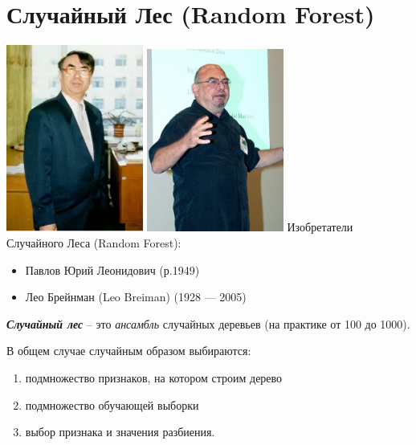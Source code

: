 \documentclass{beamer}
\newcommand{\termdef}[1]{\textbf{\textit{#1}}}
\newcommand{\term}{\textit}
\begin{document}
\section{Случайный Лес (Random Forest)}\label{section:random_forest}

\begin{frame}
	\includegraphics[width=4.5cm]{../pic/ylpavlov.png}
	\includegraphics[width=4.5cm]{../pic/leo_breiman.png}
	Изобретатели Случайного Леса (Random Forest):
	\begin{itemize}
	\item Павлов Юрий Леонидович (р.1949)
	\item Лео Брейнман (Leo Breiman) (1928 — 2005)
	\end{itemize}
\end{frame}

\begin{frame}
	\termdef{Случайный лес} -- это \term{ансамбль}
	случайных деревьев (на практике от 100 до 1000).
	
	В общем случае случайным образом выбираются:
	\begin{enumerate}
	\item подмножество признаков, на котором строим дерево
	\item подмножество обучающей выборки
	\item выбор признака и значения разбиения.
	\end{enumerate}	
\end{frame}
\end{document}
